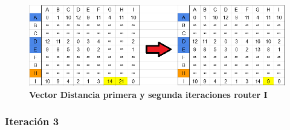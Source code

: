 \documentclass[12pt]{article}
\begin{document}
\begin{figure}[H] 
\centering 
\includegraphics[width=1\textwidth]{imagenes/3I1-2.png} \caption{\small \textbf{Vector Distancia primera y segunda iteraciones router I}}
\label{fig:diagrama_72} 
\end{figure}

\subsubsection{Iteración 3}
\end{document}
